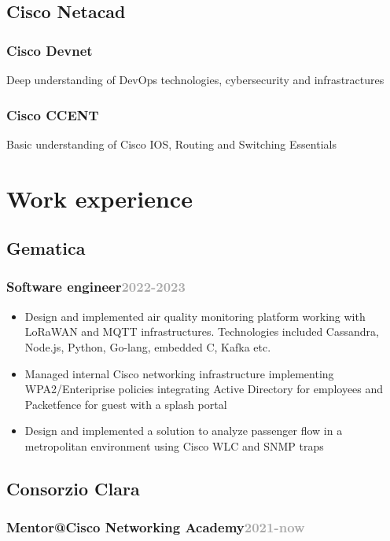 \documentclass[11pt,a4paper]{article}
\begin{document}
  \subsection{Cisco Netacad}
  \subsubsection{Cisco Devnet} Deep understanding of DevOps technologies, cybersecurity and infrastractures
  \subsubsection{Cisco CCENT} Basic understanding of Cisco IOS, Routing and Switching Essentials

  \section*{Work experience}
  \subsection{Gematica}
  \subsubsection{Software engineer\hfill \textcolor{darkgray}{\small{2022-2023}}}
  \begin{itemize}
    \item Design and implemented air quality monitoring platform working with LoRaWAN and MQTT infrastructures. Technologies included 
      Cassandra, Node.js, Python, Go-lang, embedded C, Kafka etc.
    \item Managed internal Cisco networking infrastructure implementing WPA2/Enteriprise policies integrating Active Directory for employees and Packetfence for guest with a splash portal
    \item Design and implemented a solution to analyze passenger flow in a metropolitan environment using Cisco WLC and SNMP traps
  \end{itemize}

  \subsection{Consorzio Clara}
  \subsubsection{Mentor@Cisco Networking Academy\hfill \textcolor{darkgray}{\small{2021-now}}}
\end{document}
